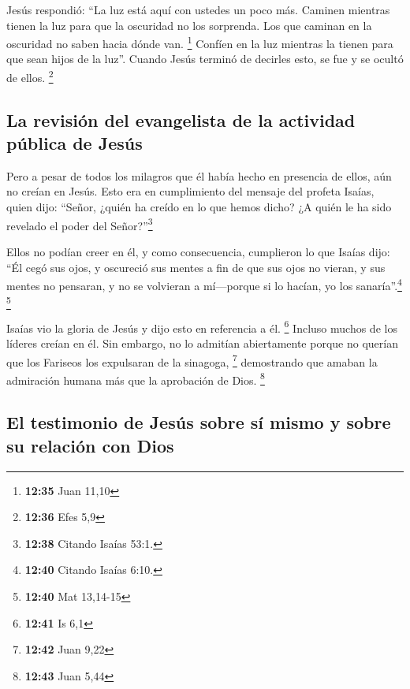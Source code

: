  Jesús respondió: ``La luz está aquí con ustedes un poco
más. Caminen mientras tienen la luz para que la oscuridad no los
sorprenda. Los que caminan en la oscuridad no saben hacia dónde van.
\footnote{\textbf{12:35} Juan 11,10}  Confíen en la luz
mientras la tienen para que sean hijos de la luz''. Cuando Jesús terminó
de decirles esto, se fue y se ocultó de ellos. \footnote{\textbf{12:36}
  Efes 5,9}

\hypertarget{la-revisiuxf3n-del-evangelista-de-la-actividad-puxfablica-de-jesuxfas}{%
\subsection{La revisión del evangelista de la actividad pública de
Jesús}\label{la-revisiuxf3n-del-evangelista-de-la-actividad-puxfablica-de-jesuxfas}}

 Pero a pesar de todos los milagros que él había hecho en
presencia de ellos, aún no creían en Jesús.  Esto era en
cumplimiento del mensaje del profeta Isaías, quien dijo: ``Señor, ¿quién
ha creído en lo que hemos dicho? ¿A quién le ha sido revelado el poder
del Señor?''\footnote{\textbf{12:38} Citando Isaías 53:1.}

 Ellos no podían creer en él, y como consecuencia,
cumplieron lo que Isaías dijo:  ``Él cegó sus ojos, y
oscureció sus mentes a fin de que sus ojos no vieran, y sus mentes no
pensaran, y no se volvieran a mí---porque si lo hacían, yo los
sanaría''.\footnote{\textbf{12:40} Citando Isaías 6:10.} \footnote{\textbf{12:40}
  Mat 13,14-15}

 Isaías vio la gloria de Jesús y dijo esto en referencia
a él. \footnote{\textbf{12:41} Is 6,1}  Incluso muchos de
los líderes creían en él. Sin embargo, no lo admitían abiertamente
porque no querían que los Fariseos los expulsaran de la sinagoga,
\footnote{\textbf{12:42} Juan 9,22}  demostrando que
amaban la admiración humana más que la aprobación de Dios. \footnote{\textbf{12:43}
  Juan 5,44}

\hypertarget{el-testimonio-de-jesuxfas-sobre-suxed-mismo-y-sobre-su-relaciuxf3n-con-dios}{%
\subsection{El testimonio de Jesús sobre sí mismo y sobre su relación
con
Dios}\label{el-testimonio-de-jesuxfas-sobre-suxed-mismo-y-sobre-su-relaciuxf3n-con-dios}}

